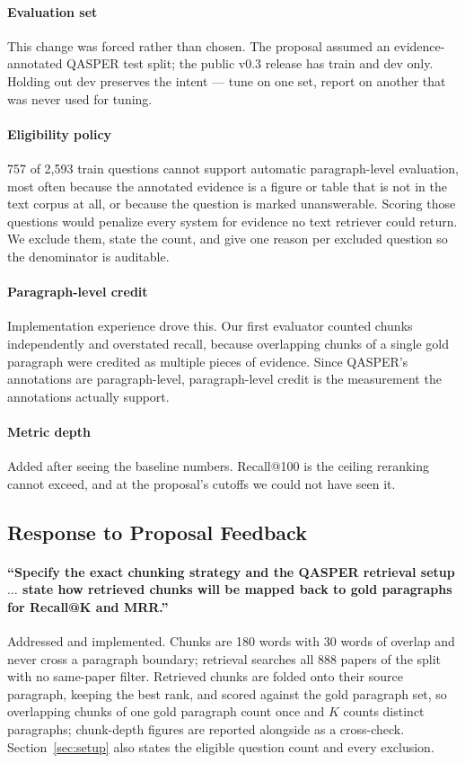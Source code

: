 \documentclass[sigconf,nonacm]{acmart}
\begin{document}
\paragraph{Evaluation set} This change was forced rather than chosen. The
proposal assumed an evidence-annotated QASPER test split; the public v0.3
release has train and dev only. Holding out dev preserves the intent --- tune on
one set, report on another that was never used for tuning.

\paragraph{Eligibility policy} 757 of 2{,}593 train questions cannot support
automatic paragraph-level evaluation, most often because the annotated evidence
is a figure or table that is not in the text corpus at all, or because the
question is marked unanswerable. Scoring those questions would penalize every
system for evidence no text retriever could return. We exclude them, state the
count, and give one reason per excluded question so the denominator is auditable.

\paragraph{Paragraph-level credit} Implementation experience drove this. Our
first evaluator counted chunks independently and overstated recall, because
overlapping chunks of a single gold paragraph were credited as multiple pieces
of evidence. Since QASPER's annotations are paragraph-level, paragraph-level
credit is the measurement the annotations actually support.

\paragraph{Metric depth} Added after seeing the baseline numbers. Recall@100 is
the ceiling reranking cannot exceed, and at the proposal's cutoffs we could not
have seen it.

\subsection{Response to Proposal Feedback}

\paragraph{``Specify the exact chunking strategy and the QASPER retrieval setup
$\ldots$ state how retrieved chunks will be mapped back to gold paragraphs for
Recall@K and MRR.''} Addressed and implemented. Chunks are 180 words with 30
words of overlap and never cross a paragraph boundary; retrieval searches all 888
papers of the split with no same-paper filter. Retrieved chunks are folded onto
their source paragraph, keeping the best rank, and scored against the gold
paragraph set, so overlapping chunks of one gold paragraph count once and $K$
counts distinct paragraphs; chunk-depth figures are reported alongside as a
cross-check. Section~\ref{sec:setup} also states the eligible question count and
every exclusion.
\end{document}
